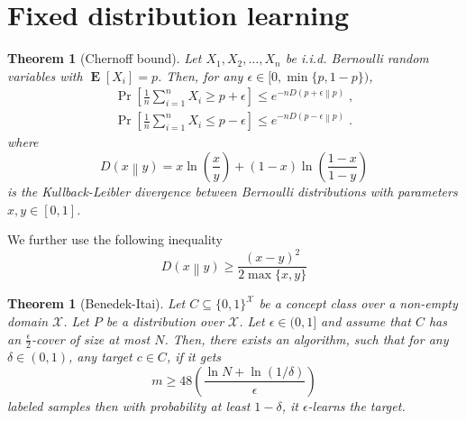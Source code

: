 \documentclass[11pt]{article}
\newtheorem{theorem}[proposition]{Theorem}
\newcommand{\X}{\mathcal{X}}
\newcommand{\KL}[2]{D\left(#1 \middle\| #2 \right)}
\DeclareMathOperator{\Exp}{\mathbf{E}}
\begin{document}
\section{Fixed distribution learning}
\label{section:fixed-distribution-learning}

\begin{theorem}[Chernoff bound]
Let $X_1, X_2, \dots, X_n$ be i.i.d. Bernoulli random variables with $\Exp[X_i] = p$.
Then, for any $\epsilon \in [0, \min\{p,1-p\})$,
\begin{align*}
\Pr \left[{\frac {1}{n}} \sum_{i=1}^n X_i \ge p + \epsilon \right] \le e^{ - n \KL{p + \epsilon}{p}}  \; , \\
\Pr \left[{\frac {1}{n}} \sum_{i=1}^n X_i \le p - \epsilon \right] \le e^{ - n \KL{p - \epsilon}{p}}  \; .
\end{align*}
where
$$
\KL{x}{y} = x \ln \left( \frac{x}{y} \right) + (1 - x) \ln \left( \frac{1-x}{1-y} \right)
$$
is the Kullback-Leibler divergence between Bernoulli distributions with parameters $x, y \in [0,1]$.
\end{theorem}

We further use the following inequality
$$
\KL{x}{y} \ge \frac{(x-y)^2}{2 \max\{x, y\}}
$$


\begin{theorem}[Benedek-Itai]
\label{theorem:benedek-itai}
Let $C \subseteq \{0,1\}^\X$ be a concept class over a non-empty domain $\X$.
Let $P$ be a distribution over $\X$. Let $\epsilon \in (0,1]$ and assume that
$C$ has an $\frac{\epsilon}{2}$-cover of size at most $N$. Then, there exists an
algorithm, such that for any $\delta \in (0,1)$, any target $c \in C$, if it
gets
$$
m \ge 48\left(\frac{\ln N + \ln(1/\delta)}{\epsilon}\right)
$$
labeled samples then with probability at least $1 - \delta$, it
$\epsilon$-learns the target.
\end{theorem}
\end{document}
